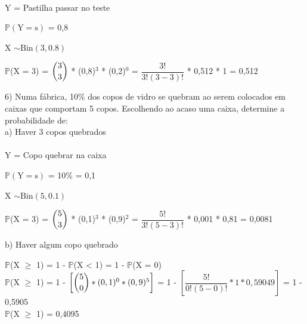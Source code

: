 \documentclass[12pt,a4paper,draft]{article}
\begin{document}
	\vspace{0.5cm}\\
	Y = Pastilha passar no teste
	\begin{center}
		\vspace{1cm}
		$\mathbb{P}\left(\text{Y} = \text{s}\right)$ = 0,8
		\vspace{1cm}\\
	\end{center}
	X $\sim \text{Bin}(3, 0.8)$
	\vspace{1cm}\\
	\begin{center}
		$\mathbb{P}$(X = 3) = $\dbinom{3}{3}$ * (0,8)$^{3}$ * (0,2)$^0$ = $\dfrac{3!}{3!(3-3)!}$ * 0,512 * 1 = 0,512
	\end{center}
	\vspace{1cm}
	6) Numa fábrica, 10\% dos copos de vidro se quebram ao serem colocados em caixas	que comportam 5 copos. Escolhendo ao acaso uma caixa, determine a probabilidade de:\\
	a) Haver 3 copos quebrados\\
	\vspace{0.5cm}\\
	Y = Copo quebrar na caixa
	\begin{center}
		\vspace{1cm}
		$\mathbb{P}\left(\text{Y} = \text{s}\right)$ = 10\% = 0,1
		\vspace{1cm}\\
	\end{center}
	X $\sim \text{Bin}(5, 0.1)$
	\vspace{1cm}\\
	\begin{center}
		$\mathbb{P}$(X = 3) = $\dbinom{5}{3}$ * (0,1)$^{3}$ * (0,9)$^2$ = $\dfrac{5!}{3!(5-3)!}$ * 0,001 * 0,81 = 0,0081
	\end{center}
	\vspace{1cm}
	b) Haver algum copo quebrado
	\vspace{0.5cm}\\
	\begin{center}
		$\mathbb{P}$(X $\geq$ 1) = 1 - $\mathbb{P}$(X < 1) = 1 - $\mathbb{P}$(X = 0)
		\vspace{0.5cm}\\
		$\mathbb{P}$(X $\geq$ 1) = 1 - $\left[\dbinom{5}{0} * (0,1)^{0} * (0,9)^5\right]$ = 1 - $\left[\dfrac{5!}{0!(5-0)!} * 1 * 0,59049\right]$ = 1 - 0,5905
		\vspace{0.5cm}\\
		$\mathbb{P}$(X $\geq$ 1) = 0,4095
	\end{center}	
\end{document}
